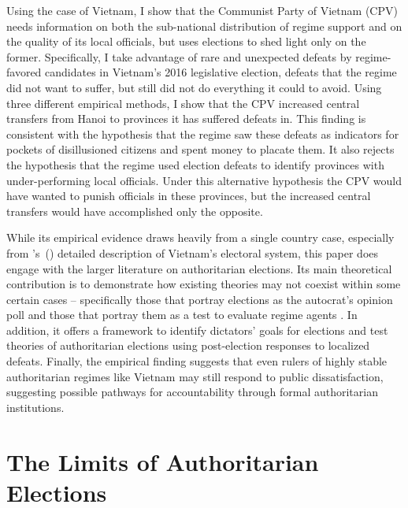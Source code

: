 \documentclass[12pt]{article}
\newcommand\citepos[1]{\citeauthor{#1}'s\ (\citeyear{#1})}
\newcommand{\1}{\mathbbm{1}}
\begin{document}
Using the case of Vietnam, I show that the Communist Party of Vietnam (CPV) needs information on both the sub-national distribution of regime support and on the quality of its local officials, but uses elections to shed light only on the former. Specifically, I take advantage of rare and unexpected defeats by regime-favored candidates in Vietnam's 2016 legislative election, defeats that the regime did not want to suffer, but still did not do everything it could to avoid. Using three different empirical methods, I show that the CPV increased central transfers from Hanoi to provinces it has suffered defeats in. This finding is consistent with the hypothesis that the regime saw these defeats as indicators for pockets of disillusioned citizens and spent money to placate them. It also rejects the hypothesis that the regime used election defeats to identify provinces with under-performing local officials. Under this alternative hypothesis the CPV would have wanted to punish officials in these provinces, but the increased central transfers would have accomplished only the opposite.

While its empirical evidence draws heavily from a single country case, especially from \citepos{MaleskySchuler2011} detailed description of Vietnam's electoral system, this paper does engage with the larger literature on authoritarian elections. Its main theoretical contribution is to demonstrate how existing theories may not coexist within some certain cases -- specifically those that portray elections as the autocrat's opinion poll \citep[e.g.][]{Miller2015, Magaloni2006, Blaydes2008} and those that portray them as a test to evaluate regime agents \citep[e.g.][]{Magaloni2006, Blaydes2008,Myagkov2009,RundlettSvolik2016}. In addition, it offers a framework to identify dictators' goals for elections and test theories of authoritarian elections using post-election responses to localized defeats. Finally, the empirical finding suggests that even rulers of highly stable authoritarian regimes like Vietnam may still respond to public dissatisfaction, suggesting possible pathways for accountability through formal authoritarian institutions.

\section{The Limits of Authoritarian Elections}
\label{sec:theory_limits}
\end{document}

